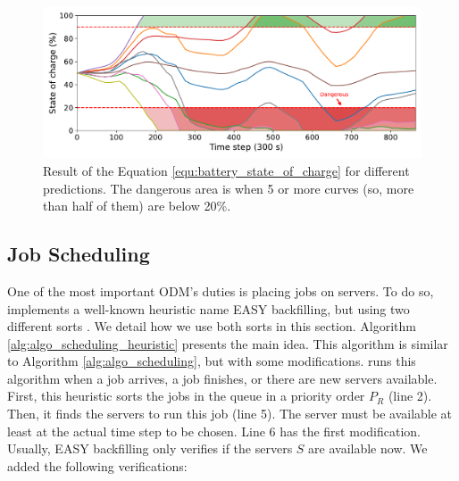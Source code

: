 \begin{figure}[!htb]
    \centering
    \includegraphics[scale=0.5]{Images/Heuristics/state_of_charge.pdf}
    \caption{Result of the Equation \ref{equ:battery_state_of_charge} for different predictions. The dangerous area is when 5 or more curves (so, more than half of them) are below 20\%.}
    \label{fig:estimated_state_of_charge}
\end{figure}

\subsection{Job Scheduling}
\label{sec:model_easy}

One of the most important ODM's duties is placing jobs on servers. To do so, \emph{\systemName} implements a well-known heuristic name EASY backfilling, but using two different sorts \cite{mu2001utilization, lelong2018tuning}. We detail how we use both sorts in this section. Algorithm \ref{alg:algo_scheduling_heuristic} presents the main idea. This algorithm is similar to Algorithm \ref{alg:algo_scheduling}, but with some modifications. \emph{\systemName} runs this algorithm when a job arrives, a job finishes, or there are new servers available. First, this heuristic sorts the jobs in the queue in a priority order $P_{R}$ (line 2). Then, it finds the servers to run this job (line 5). The server must be available at least at the actual time step to be chosen. Line 6 has the first modification. Usually, EASY backfilling only verifies if the servers $S$ are available now. We added the following verifications:

